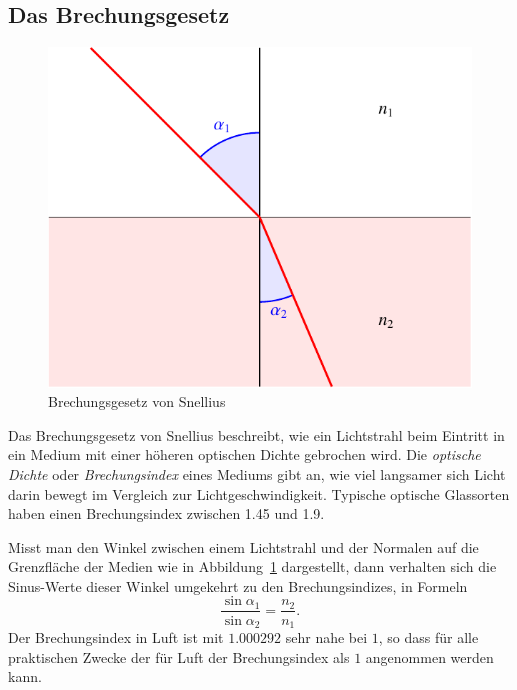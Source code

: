 %
%
%
\subsection{Das Brechungsgesetz\label{mo:subsection:brechungsgesetz}}
\begin{figure}
\centering
\includegraphics{applications/matrixoptik/snellius.pdf}
\caption{Brechungsgesetz von Snellius
\label{mo:snellius}}
\end{figure}
Das Brechungsgesetz von Snellius beschreibt, wie ein Lichtstrahl beim
Eintritt in ein Medium mit einer höheren optischen Dichte gebrochen
wird.
Die {\em optische Dichte} oder {\em Brechungsindex} eines Mediums gibt an,
wie viel langsamer 
sich Licht darin bewegt im Vergleich zur Lichtgeschwindigkeit.
Typische optische Glassorten haben einen Brechungsindex zwischen
1.45 und 1.9.

Misst man den Winkel zwischen einem Lichtstrahl und der Normalen auf
die Grenzfläche der Medien wie in Abbildung~\ref{mo:snellius}
dargestellt, dann verhalten sich die Sinus-Werte dieser Winkel
umgekehrt zu den Brechungsindizes, in Formeln
\begin{equation}
\frac{\sin \alpha_1}{\sin\alpha_2} = \frac{n_2}{n_1}.
\label{mo:eq:snellius}
\end{equation}
Der Brechungsindex in Luft ist mit $1.000292$ sehr nahe bei $1$, so
dass für alle praktischen Zwecke der für Luft der Brechungsindex als
$1$ angenommen werden kann.





